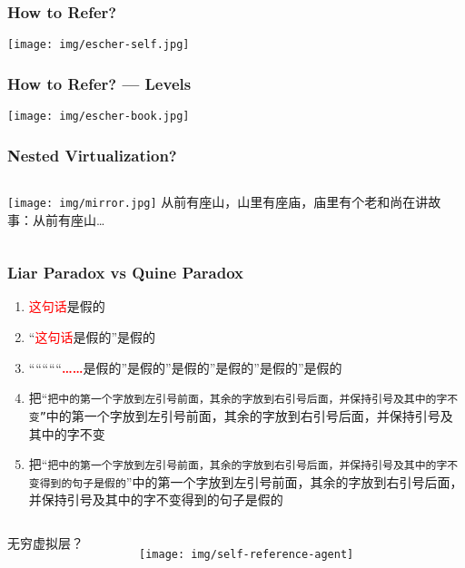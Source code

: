 \documentclass[UTF8,11pt,colorlinks,compress,openany]{beamer}%
\begin{document}
\begin{frame}\frametitle{How to Refer?}\centering
\texttt{[image: img/escher-self.jpg]}
\end{frame}

\begin{frame}\frametitle{How to Refer? --- Levels}\centering
\texttt{[image: img/escher-book.jpg]}
\end{frame}

\begin{frame}\frametitle{Nested Virtualization?}
\begin{columns}
\centering
\texttt{[image: img/mirror.jpg]}
从前有座山，山里有座庙，庙里有个老和尚在讲故事：从前有座山\dots
\end{columns}
\end{frame}

\begin{frame}\frametitle{Liar Paradox vs Quine Paradox}
\begin{enumerate}
\item \textcolor{red}{这句话}是假的
\item “\textcolor{red}{这句话}是假的”是假的
\item “““““\textcolor{red}{\textbf{……}}是假的”是假的”是假的”是假的”是假的”是假的
\item 把“\texttt{把中的第一个字放到左引号前面，其余的字放到右引号后面，并保持引号及其中的字不变”}中的第一个字放到左引号前面，其余的字放到右引号后面，并保持引号及其中的字不变
\item 把“\texttt{把中的第一个字放到左引号前面，其余的字放到右引号后面，并保持引号及其中的字不变得到的句子是假的}”中的第一个字放到左引号前面，其余的字放到右引号后面，并保持引号及其中的字不变得到的句子是假的
\end{enumerate}\vspace*{-5ex}
\begin{columns}
\begin{flushright}
\vspace*{7ex} 无穷虚拟层？
\end{flushright}
	\begin{figure}[H]\hspace*{-.6\textwidth}
		\texttt{[image: img/self-reference-agent]}
	\end{figure}
\end{columns}
\end{frame}
\end{document}
